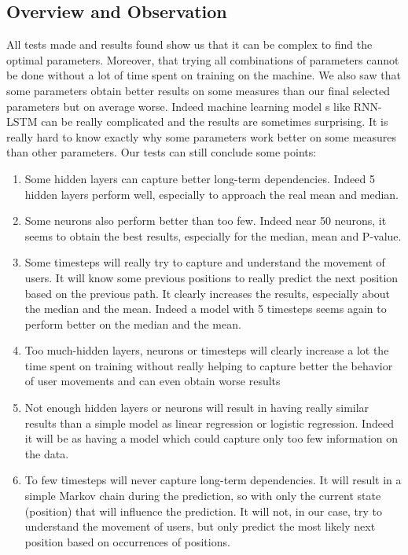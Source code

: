 \documentclass[a4]{article}
\begin{document}
\subsection{Overview and Observation}
All tests made and results found show us that it can be complex to find the optimal parameters. Moreover, that trying all combinations of parameters cannot be done without a lot of time spent on training on the machine. We also saw that some parameters obtain better results on some measures than our final selected parameters but on average worse. Indeed machine learning model s like RNN-LSTM can be really complicated and the results are sometimes surprising. It is really hard to know exactly why some parameters work better on some measures than other parameters. Our tests can still conclude some points:
\begin{enumerate}
\item Some hidden layers can capture better long-term dependencies. Indeed 5 hidden layers perform well, especially to approach the real mean and median.
\item Some neurons also perform better than too few. Indeed near 50 neurons, it seems to obtain the best results, especially for the median, mean and P-value.
\item Some timesteps will really try to capture and understand the movement of users. It will know some previous positions to really predict the next position based on the previous path. It clearly increases the results, especially about the median and the mean. Indeed a model with 5 timesteps seems again to perform better on the median and the mean. 
\item Too much-hidden layers, neurons or timesteps will clearly increase a lot the time spent on training without really helping to capture better the behavior of user movements and can even obtain worse results 
\item Not enough hidden layers or neurons will result in having really similar results than a simple model as linear regression or logistic regression. Indeed it will be as having a model which could capture only too few information on the data.
\item To few timesteps will never capture long-term dependencies. It will result in a simple Markov chain during the prediction, so with only the current state (position) that will influence the prediction. It will not, in our case, try to understand the movement of users, but only predict the most likely next position based on occurrences of positions.
\end{enumerate}
\end{document}
